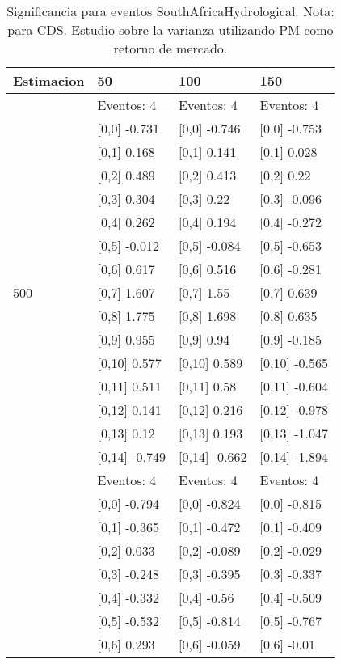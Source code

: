 \begin{table}

\caption{Significancia para eventos SouthAfricaHydrological. Nota: para CDS. Estudio sobre la varianza utilizando PM como retorno de mercado.}
\centering
\begin{tabular}[t]{llll}
\toprule
Estimacion & 50 & 100 & 150\\
\midrule
 & Eventos:  4 & Eventos:  4 & Eventos:  4\\
 & {}[0,0] -0.731 & {}[0,0] -0.746 & {}[0,0] -0.753\\
 & {}[0,1] 0.168 & {}[0,1] 0.141 & {}[0,1] 0.028\\
 & {}[0,2] 0.489 & {}[0,2] 0.413 & {}[0,2] 0.22\\
 & {}[0,3] 0.304 & {}[0,3] 0.22 & {}[0,3] -0.096\\
\addlinespace
 & {}[0,4] 0.262 & {}[0,4] 0.194 & {}[0,4] -0.272\\
 & {}[0,5] -0.012 & {}[0,5] -0.084 & {}[0,5] -0.653\\
 & {}[0,6] 0.617 & {}[0,6] 0.516 & {}[0,6] -0.281\\
500 & {}[0,7] 1.607 & {}[0,7] 1.55 & {}[0,7] 0.639\\
 & {}[0,8] 1.775 & {}[0,8] 1.698 & {}[0,8] 0.635\\
\addlinespace
 & {}[0,9] 0.955 & {}[0,9] 0.94 & {}[0,9] -0.185\\
 & {}[0,10] 0.577 & {}[0,10] 0.589 & {}[0,10] -0.565\\
 & {}[0,11] 0.511 & {}[0,11] 0.58 & {}[0,11] -0.604\\
 & {}[0,12] 0.141 & {}[0,12] 0.216 & {}[0,12] -0.978\\
 & {}[0,13] 0.12 & {}[0,13] 0.193 & {}[0,13] -1.047\\
\addlinespace
 & {}[0,14] -0.749 & {}[0,14] -0.662 & {}[0,14] -1.894\\
 & Eventos:  4 & Eventos:  4 & Eventos:  4\\
 & {}[0,0] -0.794 & {}[0,0] -0.824 & {}[0,0] -0.815\\
 & {}[0,1] -0.365 & {}[0,1] -0.472 & {}[0,1] -0.409\\
 & {}[0,2] 0.033 & {}[0,2] -0.089 & {}[0,2] -0.029\\
\addlinespace
 & {}[0,3] -0.248 & {}[0,3] -0.395 & {}[0,3] -0.337\\
 & {}[0,4] -0.332 & {}[0,4] -0.56 & {}[0,4] -0.509\\
 & {}[0,5] -0.532 & {}[0,5] -0.814 & {}[0,5] -0.767\\
 & {}[0,6] 0.293 & {}[0,6] -0.059 & {}[0,6] -0.01\\

\end{tabular}
\end{table}
